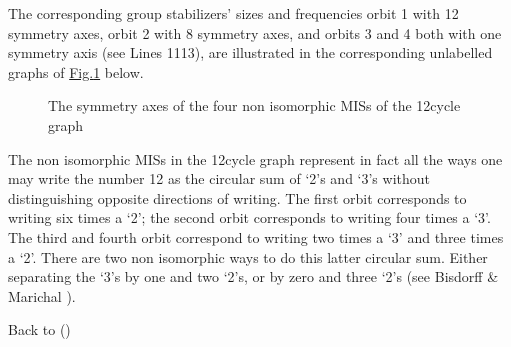 \documentclass[a4paper,10pt,english]{sphinxhowto}
\let\sphinxpxdimen\pdfpxdimen\else\newdimen\sphinxpxdimen
\begin{document}
The corresponding group stabilizers’ sizes and frequencies \textendash{} orbit 1 with 12 symmetry axes, orbit 2 with 8 symmetry axes, and orbits 3 and 4 both with one symmetry axis (see Lines 11\sphinxhyphen{}13), are illustrated in the corresponding unlabelled graphs of \hyperref[\detokenize{tutorial:misc12}]{Fig.\@ \ref{\detokenize{tutorial:misc12}}} below.

\begin{figure}[htbp]
\centering
\capstart

\noindent\sphinxincludegraphics[width=400\sphinxpxdimen]{{c12}.png}
\caption{The symmetry axes of the four non isomorphic MISs of the 12\sphinxhyphen{}cycle graph}\label{\detokenize{tutorial:misc12}}\end{figure}

The non isomorphic MISs in the 12\sphinxhyphen{}cycle graph represent in fact all the ways one may write the number 12 as the circular sum of ‘2’s and ‘3’s without distinguishing opposite directions of writing. The first orbit corresponds to writing six times a ‘2’; the second orbit corresponds to writing four times a ‘3’. The third and fourth orbit correspond to writing two times a ‘3’ and three times a ‘2’. There are two non isomorphic ways to do this latter circular sum. Either separating the ‘3’s by one and two ‘2’s, or by zero and three ‘2’s (see Bisdorff \& Marichal  ).

Back to {\hyperref[\detokenize{tutorial:tutorial-label}]{}} ()
\end{document}
